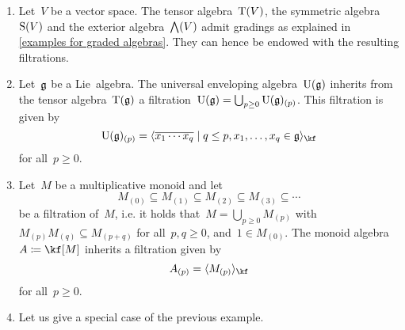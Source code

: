 \begin{examples}
  \label{examples for filtered algebras}
  \leavevmode
  \begin{enumerate}
    \item
      Let~$V$ be a vector space.
      The tensor algebra~$\operatorname{T}(V)$, the symmetric algebra~$\operatorname{S}(V)$ and the exterior algebra~$\operatorname{\bigwedge}(V)$ admit gradings as explained in \cref{examples for graded algebras}.
      They can hence be endowed with the resulting filtrations.
    \item
      Let~$\mathfrak{g}$ be a Lie~algebra.
      The universal enveloping algebra~$\operatorname{U}(\mathfrak{g})$ inherits from the tensor algebra~$\operatorname{T}(\mathfrak{g})$ a filtration~$\operatorname{U}(\mathfrak{g}) = \bigcup_{p \geq 0} \operatorname{U}(\mathfrak{g})_{(p)}$.
      This filtration is given by
      \[
        \Univ(\glie)_{(p)}
        =
        \gen{
          \class{x_1 \dotsm x_q}
        \suchthat
          q \leq p,
          x_1, \dotsc, x_q \in \glie
        }_{\kf}
      \]
      for all~$p \geq 0$.
    \item
      Let~$M$ be a multiplicative monoid and let
      \[
        M_{(0)}
        \subseteq
        M_{(1)}
        \subseteq
        M_{(2)}
        \subseteq
        M_{(3)}
        \subseteq
        \dotsb
      \]
      be a filtration of~$M$, i.e. it holds that~$M = \bigcup_{p \geq 0} M_{(p)}$ with~$M_{(p)} M_{(q)} \subseteq M_{(p+q)}$ for all~$p, q \geq 0$, and~$1 \in M_{(0)}$.
      The monoid algebra~$A \defined \kf[M]$ inherits a filtration given by
      \[
        A_{(p)}
        =
        \gen{ M_{(p)} }_{\kf}
      \]
      for all~$p \geq 0$.
    \item
      Let us give a special case of the previous example.


\end{enumerate}
\end{examples}
